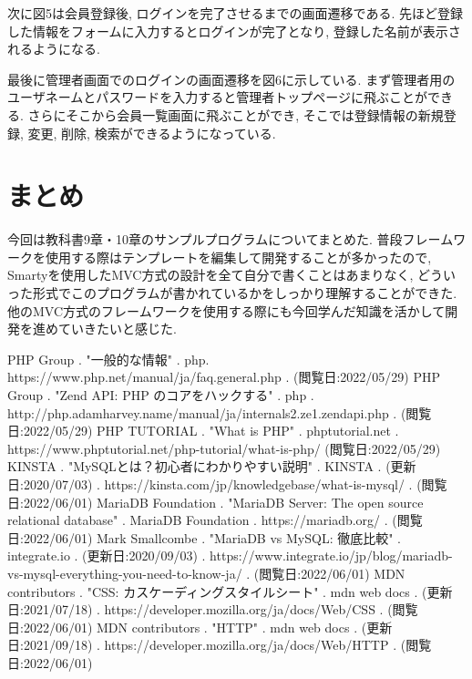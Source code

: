 \documentclass[submit,techrep]{ipsj}
\begin{document}
次に図5は会員登録後, ログインを完了させるまでの画面遷移である. 先ほど登録した情報をフォームに入力するとログインが完了となり, 登録した名前が表示されるようになる.


最後に管理者画面でのログインの画面遷移を図6に示している. まず管理者用のユーザネームとパスワードを入力すると管理者トップページに飛ぶことができる. さらにそこから会員一覧画面に飛ぶことができ, そこでは登録情報の新規登録, 変更, 削除, 検索ができるようになっている. 

\section{まとめ}
今回は教科書9章・10章のサンプルプログラムについてまとめた. 普段フレームワークを使用する際はテンプレートを編集して開発することが多かったので, Smartyを使用したMVC方式の設計を全て自分で書くことはあまりなく, どういった形式でこのプログラムが書かれているかをしっかり理解することができた. 
他のMVC方式のフレームワークを使用する際にも今回学んだ知識を活かして開発を進めていきたいと感じた. 



\begin{thebibliography}{9}
 PHP Group . "一般的な情報" . php. https://www.php.net/manual/ja/faq.general.php . (閲覧日:2022/05/29)
 PHP Group . "Zend API: PHP のコアをハックする" . php . http://php.adamharvey.name/manual/ja/internals2.ze1.zendapi.php . (閲覧日:2022/05/29)
 PHP TUTORIAL . "What is PHP" . phptutorial.net . https://www.phptutorial.net/php-tutorial/what-is-php/ (閲覧日:2022/05/29)
 KINSTA . "MySQLとは？初心者にわかりやすい説明" . KINSTA . (更新日:2020/07/03) . https://kinsta.com/jp/knowledgebase/what-is-mysql/ . (閲覧日:2022/06/01)
 MariaDB Foundation . "MariaDB Server: The open source relational database" . MariaDB Foundation . https://mariadb.org/ . (閲覧日:2022/06/01)
 Mark Smallcombe . "MariaDB vs MySQL: 徹底比較" . integrate.io . (更新日:2020/09/03) . https://www.integrate.io/jp/blog/mariadb-vs-mysql-everything-you-need-to-know-ja/ . (閲覧日:2022/06/01)
 MDN contributors . "CSS: カスケーディングスタイルシート" . mdn web docs . (更新日:2021/07/18) . https://developer.mozilla.org/ja/docs/Web/CSS . (閲覧日:2022/06/01)
 MDN contributors . "HTTP" . mdn web docs . (更新日:2021/09/18) . https://developer.mozilla.org/ja/docs/Web/HTTP . (閲覧日:2022/06/01)
\end{thebibliography}
\end{document}
